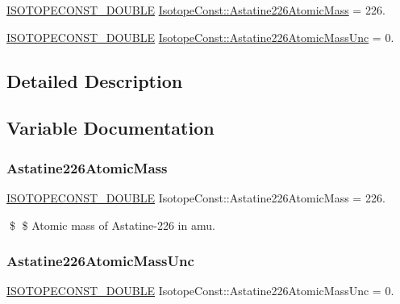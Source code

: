 \begin{DoxyCompactItemize}
\item 
\mbox{\hyperlink{group___isotope_const-_macros_ga8f45a7272ce02c0b4c65c44636ed719a}{I\+S\+O\+T\+O\+P\+E\+C\+O\+N\+S\+T\+\_\+\+D\+O\+U\+B\+LE}} \mbox{\hyperlink{group___isotope_const-_astatine-_at226_gae879b7b8949b7df9332c76c592a078fb}{Isotope\+Const\+::\+Astatine226\+Atomic\+Mass}} = 226.
\item 
\mbox{\hyperlink{group___isotope_const-_macros_ga8f45a7272ce02c0b4c65c44636ed719a}{I\+S\+O\+T\+O\+P\+E\+C\+O\+N\+S\+T\+\_\+\+D\+O\+U\+B\+LE}} \mbox{\hyperlink{group___isotope_const-_astatine-_at226_ga3156e4417f764387d3e19340c2a36861}{Isotope\+Const\+::\+Astatine226\+Atomic\+Mass\+Unc}} = 0.
\end{DoxyCompactItemize}


\subsection{Detailed Description}


\subsection{Variable Documentation}
\mbox{\label{group___isotope_const-_astatine-_at226_gae879b7b8949b7df9332c76c592a078fb}} 
\subsubsection{\texorpdfstring{Astatine226\+Atomic\+Mass}{Astatine226AtomicMass}}
{\footnotesize\ttfamily \mbox{\hyperlink{group___isotope_const-_macros_ga8f45a7272ce02c0b4c65c44636ed719a}{I\+S\+O\+T\+O\+P\+E\+C\+O\+N\+S\+T\+\_\+\+D\+O\+U\+B\+LE}} Isotope\+Const\+::\+Astatine226\+Atomic\+Mass = 226.}

\$ \$ Atomic mass of Astatine-\/226 in amu. \mbox{\label{group___isotope_const-_astatine-_at226_ga3156e4417f764387d3e19340c2a36861}} 
\subsubsection{\texorpdfstring{Astatine226\+Atomic\+Mass\+Unc}{Astatine226AtomicMassUnc}}
{\footnotesize\ttfamily \mbox{\hyperlink{group___isotope_const-_macros_ga8f45a7272ce02c0b4c65c44636ed719a}{I\+S\+O\+T\+O\+P\+E\+C\+O\+N\+S\+T\+\_\+\+D\+O\+U\+B\+LE}} Isotope\+Const\+::\+Astatine226\+Atomic\+Mass\+Unc = 0.}

